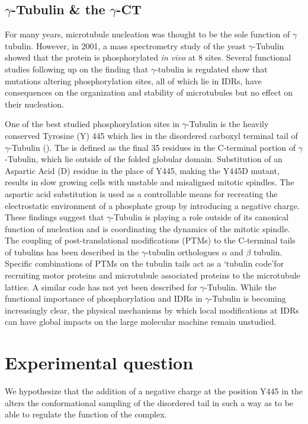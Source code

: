 \subsection{$\gamma$-Tubulin \& the $\gamma$-CT}

For many years, microtubule nucleation was thought to be the sole function of $\gamma$ tubulin. However, in 2001, a mass spectrometry study of the yeast $\gamma$-Tubulin showed that the protein is phosphorylated {\it in vivo} at 8 sites. Several functional studies following up on the finding that $\gamma$-tubulin is regulated show that mutations altering phosphorylation sites, all of which lie in IDRs, have consequences on the organization and stability of microtubules but no effect on their nucleation.  

One of the best studied phosphorylation sites in $\gamma$-Tubulin is the heavily conserved Tyrosine (Y) 445 which lies in the disordered carboxyl terminal tail of $\gamma$-Tubulin (\gct).  The \gct{} is defined as the final 35 residues in the C-terminal portion of $\gamma$-Tubulin, which lie outside of the folded globular domain. Substitution of an Aspartic Acid (D) residue in the place of Y445, making the Y445D mutant, results in slow growing cells with unstable and misaligned mitotic spindles. The aspartic acid substitution is used as a controllable means for recreating the electrostatic environment of a phosphate group by introducing a negative charge. These findings suggest that $\gamma$-Tubulin is playing a role outside of its canonical function of nucleation and is coordinating the dynamics of the mitotic spindle. The coupling of post-translational modifications (PTMs) to the C-terminal tails of tubulins has been described in the $\gamma$-tubulin orthologues $\alpha$ and $\beta$ tubulin. Specific combinations of PTMs on the tubulin tails act as a \lq tubulin code\rq for recruiting motor proteins and microtubule associated proteins to the microtubule lattice. A similar code has not yet been described for $\gamma$-Tubulin.  While the functional importance of phosphorylation and IDRs in $\gamma$-Tubulin is becoming increasingly clear, the physical mechanisms by which local modifications at IDRs can have global impacts on the large molecular machine remain unstudied. 
 
 \section{Experimental question}
 
 We hypothesize that the addition of a negative charge at the position Y445 in the \gct{} alters the conformational sampling of the disordered tail in such a way as to be able to regulate the function of the complex.  
 
